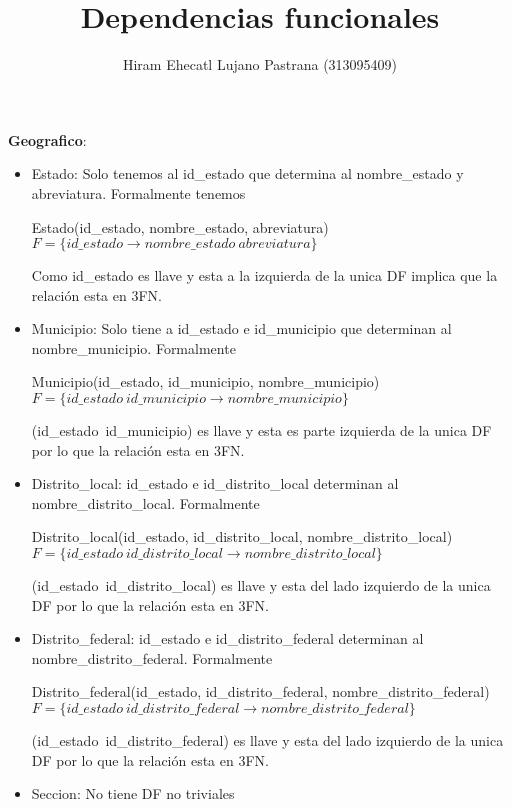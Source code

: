 \documentclass[a4paper,twoside,11pt]{article}
\title{Dependencias funcionales}
\author{Hiram Ehecatl Lujano Pastrana (313095409)}
\begin{document}
\maketitle

\textbf{Geografico}:
\begin{itemize}
  \item Estado: Solo tenemos al id\_estado que determina al nombre\_estado
        y abreviatura. Formalmente tenemos

        Estado(id\_estado, nombre\_estado, abreviatura)\\
        $F=\{id\_estado \rightarrow nombre\_estado~abreviatura\}$

        Como id\_estado es llave y esta a la izquierda de la unica DF implica
        que la relación esta en 3FN.

  \item Municipio: Solo tiene a id\_estado e id\_municipio que determinan
        al nombre\_municipio.
        Formalmente

        Municipio(id\_estado, id\_municipio, nombre\_municipio)\\
        $F=\{id\_estado~id\_municipio\rightarrow nombre\_municipio\}$

        (id\_estado~id\_municipio) es llave y esta es parte izquierda
        de la unica DF por lo que la relación esta en 3FN.

  \item Distrito\_local: id\_estado e id\_distrito\_local determinan al
        nombre\_distrito\_local. Formalmente

        Distrito\_local(id\_estado, id\_distrito\_local, nombre\_distrito\_local)\\
        $F=\{id\_estado~id\_distrito\_local\rightarrow nombre\_distrito\_local\}$

        (id\_estado~id\_distrito\_local) es llave y esta del lado izquierdo de
        la unica DF por lo que la relación esta en 3FN.

  \item Distrito\_federal: id\_estado e id\_distrito\_federal determinan al
        nombre\_distrito\_federal. Formalmente

        Distrito\_federal(id\_estado, id\_distrito\_federal, nombre\_distrito\_federal)\\
        $F=\{id\_estado~id\_distrito\_federal\rightarrow nombre\_distrito\_federal\}$

        (id\_estado~id\_distrito\_federal) es llave y esta del lado izquierdo de
        la unica DF por lo que la relación esta en 3FN.

  \item Seccion: No tiene DF no triviales

\end{itemize}
\end{document}
